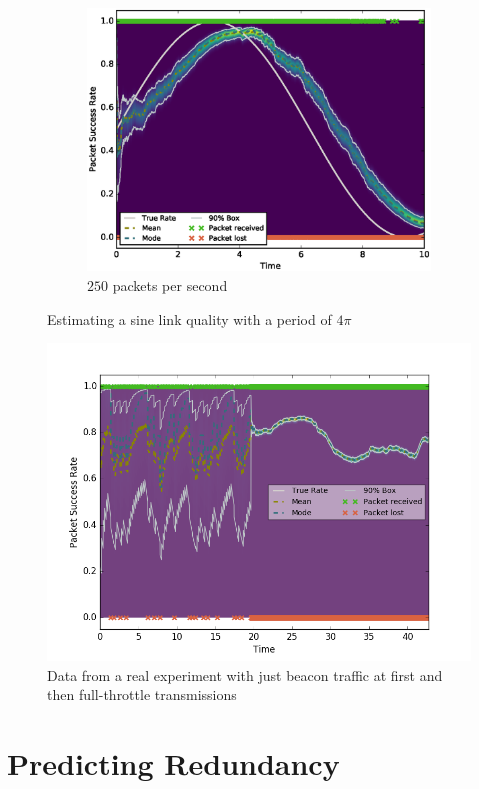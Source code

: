 \documentclass[10pt,a4paper]{article}
\begin{document}
\begin{figure}[h]
\begin{subfigure}[b]{\textwidth}
		\includegraphics[width=\textwidth]{trust/sin-2-rate-250}
		\caption{$250$ packets per second}
	\end{subfigure}
  \caption{Estimating a sine link quality with a period of $4\pi$}
\end{figure}
\begin{figure}[h!]
  \centering
  \includegraphics[width=\textwidth]{trust/heaviside-experiment}
  \caption{Data from a real experiment with just beacon traffic at first and then full-throttle transmissions}
\end{figure}

\section{Predicting Redundancy}
\end{document}
